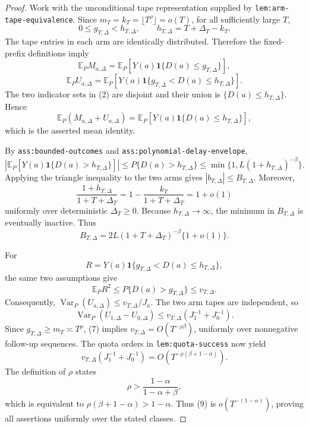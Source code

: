 \documentclass{article}
\begin{document}
\begin{proof}
Work with the unconditional tape representation supplied by \texttt{lem:arm-tape-equivalence}.  Since \(m_T=k_T=\lfloor T^\rho\rfloor=o(T)\), for all sufficiently large \(T\),
\[
 0\leq g_{T,\Delta}<h_{T,\Delta},
 \qquad h_{T,\Delta}=T+\Delta_T-k_T.                                    \tag{1}
\]
The tape entries in each arm are identically distributed.  Therefore the fixed-prefix definitions imply
\[
 \mathbb E_P M_{a,\Delta}
 =\mathbb E_P[Y(a)\mathbf 1\{D(a)\leq g_{T,\Delta}\}],
\]
\[
 \mathbb E_P U_{a,\Delta}
 =\mathbb E_P[Y(a)\mathbf 1\{g_{T,\Delta}<D(a)\leq h_{T,\Delta}\}].    \tag{2}
\]
The two indicator sets in (2) are disjoint and their union is \(\{D(a)\leq h_{T,\Delta}\}\).  Hence
\[
 \mathbb E_P(M_{a,\Delta}+U_{a,\Delta})
 =\mathbb E_P[Y(a)\mathbf 1\{D(a)\leq h_{T,\Delta}\}],                \tag{3}
\]
which is the asserted mean identity.

By \texttt{ass:bounded-outcomes} and \texttt{ass:polynomial-delay-envelope},
\[
 \left|\mathbb E_P[Y(a)\mathbf 1\{D(a)>h_{T,\Delta}\}]\right|
 \leq P\{D(a)>h_{T,\Delta}\}
 \leq\min\{1,L(1+h_{T,\Delta})^{-\beta}\}.                            \tag{4}
\]
Applying the triangle inequality to the two arms gives \(|b_{T,\Delta}|\leq B_{T,\Delta}\).  Moreover,
\[
 \frac{1+h_{T,\Delta}}{1+T+\Delta_T}
 =1-\frac{k_T}{1+T+\Delta_T}=1+o(1)                                    \tag{5}
\]
uniformly over deterministic \(\Delta_T\geq0\).  Because \(h_{T,\Delta}\to\infty\), the minimum in \(B_{T,\Delta}\) is eventually inactive.  Thus
\[
 B_{T,\Delta}=2L(1+T+\Delta_T)^{-\beta}\{1+o(1)\}.                     \tag{6}
\]

For
\[
 R=Y(a)\mathbf 1\{g_{T,\Delta}<D(a)\leq h_{T,\Delta}\},
\]
the same two assumptions give
\[
 \mathbb E_P R^2\leq P\{D(a)>g_{T,\Delta}\}
 \leq v_{T,\Delta}.                                                      \tag{7}
\]
Consequently, \(\operatorname{Var}_P(U_{a,\Delta})\leq v_{T,\Delta}/J_a\).  The two arm tapes are independent, so
\[
 \operatorname{Var}_P(U_{1,\Delta}-U_{0,\Delta})
 \leq v_{T,\Delta}(J_1^{-1}+J_0^{-1}).                                  \tag{8}
\]
Since \(g_{T,\Delta}\geq m_T\asymp T^\rho\), (7) implies \(v_{T,\Delta}=O(T^{-\rho\beta})\), uniformly over nonnegative follow-up sequences.  The quota orders in \texttt{lem:quota-success} now yield
\[
 v_{T,\Delta}(J_1^{-1}+J_0^{-1})
 =O\!\left(T^{-\rho(\beta+1-\alpha)}\right).                           \tag{9}
\]
The definition of \(\rho\) states
\[
 \rho>\frac{1-\alpha}{1-\alpha+\beta},
\]
which is equivalent to \(\rho(\beta+1-\alpha)>1-\alpha\).  Thus (9) is \(o(T^{-(1-\alpha)})\), proving all assertions uniformly over the stated classes.
\end{proof}
\end{document}
